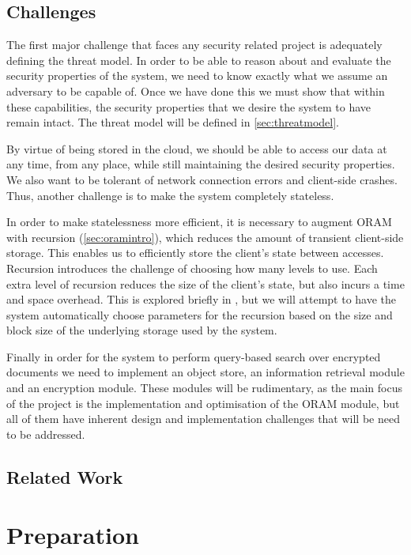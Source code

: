 \documentclass[12pt,a4paper,twoside,openright]{report}
\newcommand{\mytodo}{\todo[inline, color=green!40]}
\begin{document}
\section{Challenges}

The first major challenge that faces any security related project is adequately defining the threat model. In order to be able to reason about and evaluate the security properties of the system, we need to know exactly what we assume an adversary to be capable of. Once we have done this we must show that within these capabilities, the security properties that we desire the system to have remain intact. The threat model will be defined in \cref{sec:threatmodel}.

By virtue of being stored in the cloud, we should be able to access our data at any time, from any place, while still maintaining the desired security properties. We also want to be tolerant of network connection errors and client-side crashes. Thus, another challenge is to make the system completely stateless.

In order to make statelessness more efficient, it is necessary to augment ORAM with recursion (\cref{sec:oramintro}), which reduces the amount of transient client-side storage. This enables us to efficiently store the client's state between accesses. Recursion introduces the challenge of choosing how many levels to use. Each extra level of recursion reduces the size of the client's state, but also incurs a time and space overhead. This is explored briefly in \cite{stefanov2013path}, but we will attempt to have the system automatically choose parameters for the recursion based on the size and block size of the underlying storage used by the system.

Finally in order for the system to perform query-based search over encrypted documents we need to implement an object store, an information retrieval module and an encryption module. These modules will be rudimentary, as the main focus of the project is the implementation and optimisation of the ORAM module, but all of them have inherent design and implementation challenges that will be need to be addressed.

\section{Related Work}

\mytodo{Explore and discuss related work}

\chapter{Preparation}
\end{document}
